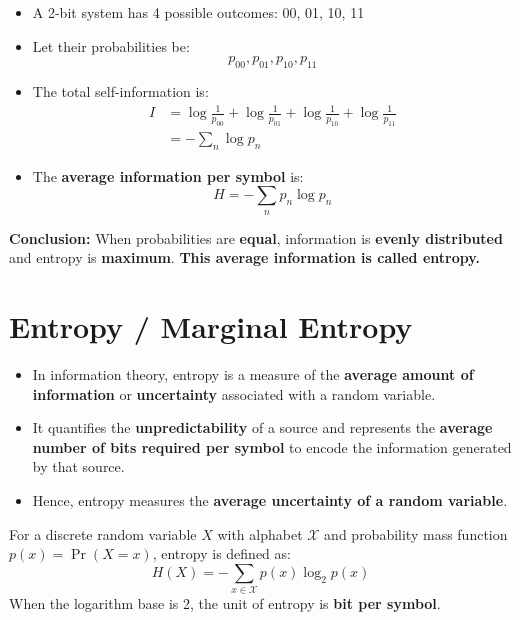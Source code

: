 \documentclass[11pt,a4paper]{book}
\newenvironment{definitionbox}[1][Definition]{
    \begin{tcolorbox}[
        enhanced,
        breakable,
        colback=primaryblue!10,
        colframe=primaryblue!150,
        title=#1,
        fonttitle=\bfseries,
        sharp corners,
        boxrule=0.8pt,
        left=8pt,
        right=8pt,
        top=6pt,
        bottom=6pt
    ]
}{
    \end{tcolorbox}
}
\newenvironment{formulabox}[1][Formula]{
    \begin{tcolorbox}[
        enhanced,
        breakable,
        colback=softcoral!10,
        colframe=softcoral!200,
        title=#1,
        fonttitle=\bfseries,
        coltitle=white,
        sharp corners,
        boxrule=1pt,
        left=8pt,
        right=8pt,
        top=6pt,
        bottom=6pt
    ]
}{
    \end{tcolorbox}
}
\newenvironment{derivationbox}[1][Derivation]{
    \begin{tcolorbox}[
        enhanced,
        breakable,
        colback=softpeach!10,
        colframe=softpeach!200,
        title=#1,
        fonttitle=\bfseries,
        sharp corners,
        boxrule=0.8pt,
        left=10pt,
        right=10pt,
        top=8pt,
        bottom=8pt
    ]
}{
    \end{tcolorbox}
}
\begin{document}
\begin{derivationbox}[Average information of 2-bit Binary System]

\begin{itemize}[label=$\rightarrow$]
    \item A 2-bit system has 4 possible outcomes: 00, 01, 10, 11
    \item Let their probabilities be:
          \[
              p_{00}, p_{01}, p_{10}, p_{11}
          \]

    \item The total self-information is:
          \begin{align*}
              I
              & = \log \frac{1}{p_{00}}
                + \log \frac{1}{p_{01}}
                + \log \frac{1}{p_{10}}
                + \log \frac{1}{p_{11}} \\
              & = -\sum_{n} \log p_n
          \end{align*}

    \item The \textbf{average information per symbol} is:
          \[
              H = -\sum_{n} p_n \log p_n
          \]
\end{itemize}

\textbf{Conclusion:}  
When probabilities are \textbf{equal}, information is \textbf{evenly distributed} and entropy is \textbf{maximum}.
\textbf{This average information is called \textbf{entropy}.}
\end{derivationbox}

\section{Entropy / Marginal Entropy}
\begin{definitionbox}[Entropy]
    \begin{itemize}
    \item In information theory, entropy is a measure of the
          \textbf{average amount of information} or \textbf{uncertainty}
          associated with a random variable.
    \item It quantifies the \textbf{unpredictability} of a source and represents the
          \textbf{average number of bits required per symbol} to encode the information
          generated by that source.
    \item Hence, entropy measures the \textbf{average uncertainty of a random variable}.
    \end{itemize}
    \begin{formulabox}[Entropy]
        For a discrete random variable \(X\) with alphabet \(\mathcal{X}\) and
          probability mass function \(p(x)=\Pr(X=x)\), entropy is defined as:
          \[
              H(X) = -\sum_{x \in \mathcal{X}} p(x)\log_2 p(x)
          \]
          When the logarithm base is 2, the unit of entropy is \textbf{bit per symbol}.
    \end{formulabox}

    
\end{definitionbox}
\end{document}
